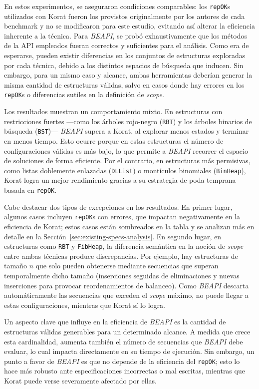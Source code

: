 En estos experimentos, se aseguraron condiciones comparables: los \texttt{repOK}s utilizados con 
\textsf{Korat} fueron los provistos originalmente por los autores de cada benchmark y no se 
modificaron para este estudio, evitando así alterar la eficiencia inherente a la técnica. 
Para \emph{BEAPI}, se probó exhaustivamente que los métodos de la API empleados fueran correctos 
y suficientes para el análisis. Como era de esperarse, pueden existir diferencias en los conjuntos 
de estructuras exploradas por cada técnica, debido a los distintos espacios de búsqueda que inducen. 
Sin embargo, para un mismo caso y alcance, ambas herramientas deberían generar la misma cantidad 
de estructuras válidas, salvo en casos donde hay errores en los \texttt{repOK}s o diferencias sutiles 
en la definición de \emph{scope}.

Los resultados muestran un comportamiento mixto. En estructuras con restricciones fuertes —como los 
árboles rojo-negro (\texttt{RBT}) y los árboles binarios de búsqueda (\texttt{BST})— \emph{BEAPI} 
supera a \textsf{Korat}, al explorar menos estados y terminar en menos tiempo. Esto ocurre porque 
en estas estructuras el número de configuraciones válidas es más bajo, lo que permite a \emph{BEAPI} 
recorrer el espacio de soluciones de forma eficiente. Por el contrario, en estructuras más permisivas, 
como listas doblemente enlazadas (\texttt{DLList}) o montículos binomiales (\texttt{BinHeap}), 
\textsf{Korat} logra un mejor rendimiento gracias a su estrategia de poda temprana basada en 
\texttt{repOK}.

Cabe destacar dos tipos de excepciones en los resultados. En primer lugar, algunos casos incluyen 
\texttt{repOK}s con errores, que impactan negativamente en la eficiencia de \textsf{Korat}; estos 
casos están sombreados en la tabla y se analizan más en detalle en la Sección~\ref{sec:existing-specs-analysis}. 
En segundo lugar, en estructuras como \texttt{RBT} y \texttt{FibHeap}, la diferencia semántica en la 
noción de \emph{scope} entre ambas técnicas produce discrepancias. Por ejemplo, hay estructuras de 
tamaño $n$ que solo pueden obtenerse mediante secuencias que superan temporalmente dicho tamaño 
(inserciones seguidas de eliminaciones y nuevas inserciones para provocar reordenamientos de balanceo). 
Como \emph{BEAPI} descarta automáticamente las secuencias que exceden el \emph{scope} máximo, no puede 
llegar a estas configuraciones, mientras que \textsf{Korat} sí lo logra.

Un aspecto clave que influye en la eficiencia de \emph{BEAPI} es la cantidad de estructuras válidas 
generables para un determinado alcance. A medida que crece esta cardinalidad, aumenta también el 
número de secuencias que \emph{BEAPI} debe evaluar, lo cual impacta directamente en su tiempo de 
ejecución. Sin embargo, un punto a favor de \emph{BEAPI} es que no depende de la eficiencia del 
\texttt{repOK}; esto lo hace más robusto ante especificaciones incorrectas o mal escritas, mientras 
que \textsf{Korat} puede verse severamente afectado por ellas.

